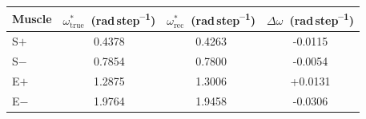 \begin{tabular}{lSSS}
\toprule
  Muscle & {$\omega^*_\mathrm{true}$~(rad\,step\textsuperscript{--1})} & {$\omega^*_\mathrm{rec}$~(rad\,step\textsuperscript{--1})} & {$\Delta\omega$~(rad\,step\textsuperscript{--1})} \\
\midrule
  S$+$ & 0.4378 & 0.4263 & -0.0115 \\
  S$-$ & 0.7854 & 0.7800 & -0.0054 \\
  E$+$ & 1.2875 & 1.3006 & +0.0131 \\
  E$-$ & 1.9764 & 1.9458 & -0.0306 \\
\bottomrule
\end{tabular}%